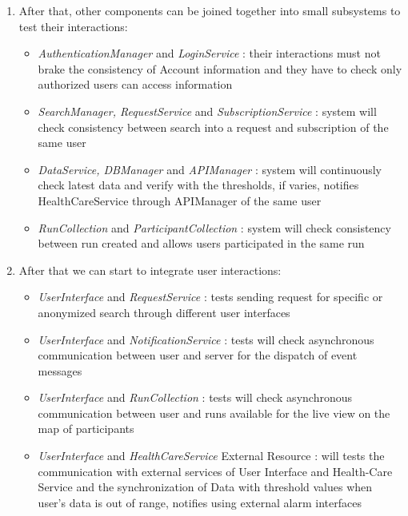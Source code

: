 \documentclass[a4paper, hidelinks, 12pt]{report}
\begin{document}
\begin{enumerate}
\item{} After that, other components can be joined together into small subsystems to test their interactions:
\begin{itemize}
\item{} \textit{AuthenticationManager} and \textit{LoginService} : their interactions must not brake the consistency of Account information and they have to check only authorized users can access information
\item{} \textit{SearchManager, RequestService} and \textit{SubscriptionService} : system will check consistency between search into a request and subscription of the same user
\item{} \textit{DataService, DBManager} and \textit{APIManager} : system will continuously check latest data and verify with the thresholds, if varies, notifies HealthCareService through APIManager of the same user
\item{} \textit{RunCollection} and \textit{ParticipantCollection} : system will check consistency between run created and allows users participated in the same run
\end{itemize}

\item{} After that we can start to integrate user interactions:
\begin{itemize}
\item{} \textit{UserInterface} and \textit{RequestService} : tests sending request for specific or anonymized search through different user interfaces
\item{} \textit{UserInterface} and \textit{NotificationService} : tests will check asynchronous communication between user and server for the dispatch of event messages
\item{} \textit{UserInterface} and \textit{RunCollection} : tests will check asynchronous communication between user and runs available for the live view on the map of participants
\item{} \textit{UserInterface} and \textit{HealthCareService} External Resource : will tests the communication
with external services of User Interface and Health-Care Service
and the synchronization of Data with threshold values when user's data is out of range, notifies using external alarm interfaces
\end{itemize}
\end{enumerate}
	
\end{document}

